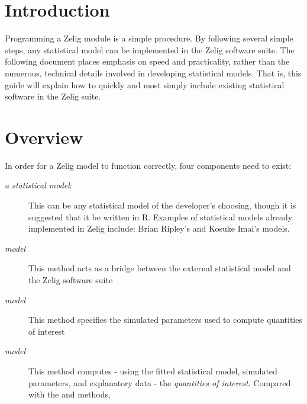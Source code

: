 

\section{Introduction}\label{section:introduction}

Programming a Zelig module is a simple procedure. By following several simple steps, any statistical model can be implemented in the Zelig software suite. The following document places emphasis on speed and practicality, rather than the numerous, technical details involved in developing statistical models. That is, this guide will explain how to quickly and most simply include existing statistical software in the Zelig suite.



\section{Overview}\label{section:overview}

In order for a Zelig model to function correctly, four components need to exist:

\begin{description}

	\item[\emph{a statistical model}:] This can be any statistical model of the developer's choosing, though it is suggested that it be written in R. Examples of statistical models already implemented in Zelig include: Brian Ripley's  and Kosuke Imai's  models.

	\item[\emph{model}] This method acts as a bridge between the external statistical model and the Zelig software suite

	\item[\emph{model}] This method specifies the simulated parameters used to compute quantities of interest

	\item[\emph{model}] This method computes - using the fitted statistical model, simulated parameters, and explanatory data - the \emph{quantities of interest}. Compared with the  and  methods, 

\end{description}

